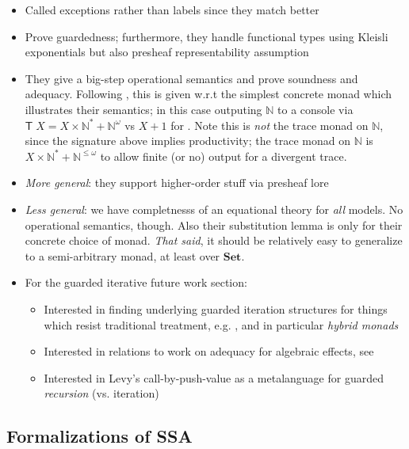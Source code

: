 \documentclass[acmsmall,screen,review]{acmart}
\newcommand{\mb}[1]{\ensuremath{\mathbf{#1}}}
\newcommand{\ms}[1]{\ensuremath{\mathsf{#1}}}
\newcommand{\nats}{\mathbb{N}}
\begin{document}
\begin{itemize}
\begin{itemize}
    \item Called exceptions rather than labels since they match better
    \item Prove guardedness; furthermore, they handle functional types using Kleisli exponentials
    but also presheaf representability assumption
    \item They give a big-step operational semantics and prove soundness and adequacy. Following
    \citet{geron-iteration-16}, this is given w.r.t the simplest concrete monad which illustrates
    their semantics; in this case outputing $\nats$ to a console via $\ms{T}\;X = X \times \nats^* +
    \nats^\omega$ vs $X + 1$ for \citet{geron-iteration-16}. Note this is \emph{not} the trace monad
    on $\nats$, since the signature above implies productivity; the trace monad on $\nats$ is
    $X \times \nats^* + \nats^{\leq \omega}$ to allow finite (or no) output for a divergent trace.
    \item \emph{More general}: they support higher-order stuff via presheaf lore
    \item \emph{Less general}: we have completnesss of an equational theory for \emph{all} models.
    No operational semantics, though. Also their substitution lemma is only for their concrete
    choice of monad. \emph{That said}, it should be relatively easy to generalize to a
    semi-arbitrary monad, at least over \mb{Set}.
    \item For the guarded iterative future work section:
    \begin{itemize}
      \item Interested in finding underlying guarded iteration structures for things which resist
      traditional treatment, e.g. \citet{nakata-hoare-15}, and in particular \emph{hybrid monads}
      \citet{goncharov-hybrid-18}
      \item Interested in relations to work on adequacy for algebraic effects, see
      \citet{plotkin-adequacy-01}
      \item Interested in Levy's call-by-push-value \cite{levy-cbpv-99} as a metalanguage for guarded
      \emph{recursion} (vs. iteration)
    \end{itemize}
  \end{itemize}
\end{itemize}

\subsection{Formalizations of SSA}
\end{document}
